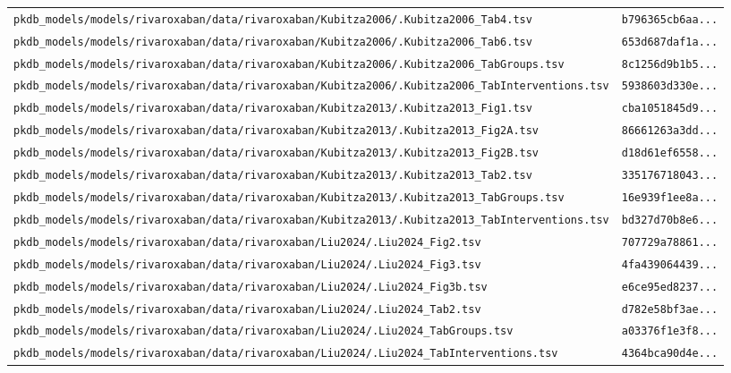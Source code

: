 \documentclass{article}
\begin{document}
\begin{longtable}{ll}
\texttt{pkdb\_models/models/rivaroxaban/data/rivaroxaban/Kubitza2006/.Kubitza2006\_Tab4.tsv} & \texttt{b796365cb6aa...} \\
\texttt{pkdb\_models/models/rivaroxaban/data/rivaroxaban/Kubitza2006/.Kubitza2006\_Tab6.tsv} & \texttt{653d687daf1a...} \\
\texttt{pkdb\_models/models/rivaroxaban/data/rivaroxaban/Kubitza2006/.Kubitza2006\_TabGroups.tsv} & \texttt{8c1256d9b1b5...} \\
\texttt{pkdb\_models/models/rivaroxaban/data/rivaroxaban/Kubitza2006/.Kubitza2006\_TabInterventions.tsv} & \texttt{5938603d330e...} \\
\texttt{pkdb\_models/models/rivaroxaban/data/rivaroxaban/Kubitza2013/.Kubitza2013\_Fig1.tsv} & \texttt{cba1051845d9...} \\
\texttt{pkdb\_models/models/rivaroxaban/data/rivaroxaban/Kubitza2013/.Kubitza2013\_Fig2A.tsv} & \texttt{86661263a3dd...} \\
\texttt{pkdb\_models/models/rivaroxaban/data/rivaroxaban/Kubitza2013/.Kubitza2013\_Fig2B.tsv} & \texttt{d18d61ef6558...} \\
\texttt{pkdb\_models/models/rivaroxaban/data/rivaroxaban/Kubitza2013/.Kubitza2013\_Tab2.tsv} & \texttt{335176718043...} \\
\texttt{pkdb\_models/models/rivaroxaban/data/rivaroxaban/Kubitza2013/.Kubitza2013\_TabGroups.tsv} & \texttt{16e939f1ee8a...} \\
\texttt{pkdb\_models/models/rivaroxaban/data/rivaroxaban/Kubitza2013/.Kubitza2013\_TabInterventions.tsv} & \texttt{bd327d70b8e6...} \\
\texttt{pkdb\_models/models/rivaroxaban/data/rivaroxaban/Liu2024/.Liu2024\_Fig2.tsv} & \texttt{707729a78861...} \\
\texttt{pkdb\_models/models/rivaroxaban/data/rivaroxaban/Liu2024/.Liu2024\_Fig3.tsv} & \texttt{4fa439064439...} \\
\texttt{pkdb\_models/models/rivaroxaban/data/rivaroxaban/Liu2024/.Liu2024\_Fig3b.tsv} & \texttt{e6ce95ed8237...} \\
\texttt{pkdb\_models/models/rivaroxaban/data/rivaroxaban/Liu2024/.Liu2024\_Tab2.tsv} & \texttt{d782e58bf3ae...} \\
\texttt{pkdb\_models/models/rivaroxaban/data/rivaroxaban/Liu2024/.Liu2024\_TabGroups.tsv} & \texttt{a03376f1e3f8...} \\
\texttt{pkdb\_models/models/rivaroxaban/data/rivaroxaban/Liu2024/.Liu2024\_TabInterventions.tsv} & \texttt{4364bca90d4e...} \\

\end{longtable}
\end{document}

